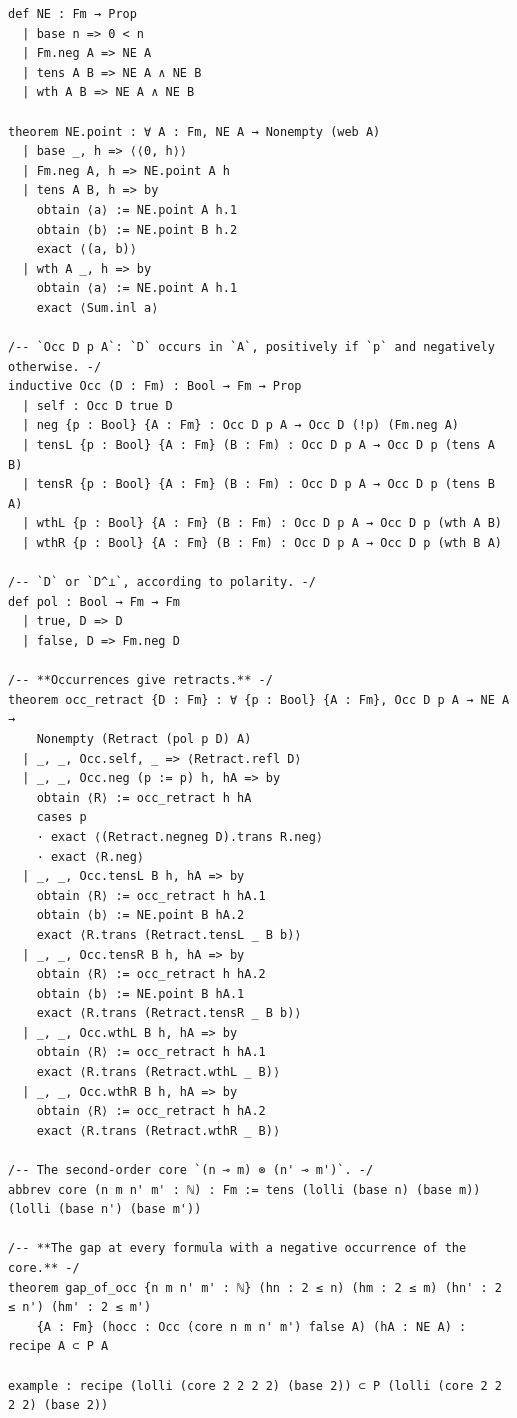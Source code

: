 \label{lean:gap-of-occ}
\begin{lstlisting}
def NE : Fm → Prop
  | base n => 0 < n
  | Fm.neg A => NE A
  | tens A B => NE A ∧ NE B
  | wth A B => NE A ∧ NE B

theorem NE.point : ∀ A : Fm, NE A → Nonempty (web A)
  | base _, h => ⟨⟨0, h⟩⟩
  | Fm.neg A, h => NE.point A h
  | tens A B, h => by
    obtain ⟨a⟩ := NE.point A h.1
    obtain ⟨b⟩ := NE.point B h.2
    exact ⟨(a, b)⟩
  | wth A _, h => by
    obtain ⟨a⟩ := NE.point A h.1
    exact ⟨Sum.inl a⟩

/-- `Occ D p A`: `D` occurs in `A`, positively if `p` and negatively otherwise. -/
inductive Occ (D : Fm) : Bool → Fm → Prop
  | self : Occ D true D
  | neg {p : Bool} {A : Fm} : Occ D p A → Occ D (!p) (Fm.neg A)
  | tensL {p : Bool} {A : Fm} (B : Fm) : Occ D p A → Occ D p (tens A B)
  | tensR {p : Bool} {A : Fm} (B : Fm) : Occ D p A → Occ D p (tens B A)
  | wthL {p : Bool} {A : Fm} (B : Fm) : Occ D p A → Occ D p (wth A B)
  | wthR {p : Bool} {A : Fm} (B : Fm) : Occ D p A → Occ D p (wth B A)

/-- `D` or `D^⊥`, according to polarity. -/
def pol : Bool → Fm → Fm
  | true, D => D
  | false, D => Fm.neg D

/-- **Occurrences give retracts.** -/
theorem occ_retract {D : Fm} : ∀ {p : Bool} {A : Fm}, Occ D p A → NE A →
    Nonempty (Retract (pol p D) A)
  | _, _, Occ.self, _ => ⟨Retract.refl D⟩
  | _, _, Occ.neg (p := p) h, hA => by
    obtain ⟨R⟩ := occ_retract h hA
    cases p
    · exact ⟨(Retract.negneg D).trans R.neg⟩
    · exact ⟨R.neg⟩
  | _, _, Occ.tensL B h, hA => by
    obtain ⟨R⟩ := occ_retract h hA.1
    obtain ⟨b⟩ := NE.point B hA.2
    exact ⟨R.trans (Retract.tensL _ B b)⟩
  | _, _, Occ.tensR B h, hA => by
    obtain ⟨R⟩ := occ_retract h hA.2
    obtain ⟨b⟩ := NE.point B hA.1
    exact ⟨R.trans (Retract.tensR _ B b)⟩
  | _, _, Occ.wthL B h, hA => by
    obtain ⟨R⟩ := occ_retract h hA.1
    exact ⟨R.trans (Retract.wthL _ B)⟩
  | _, _, Occ.wthR B h, hA => by
    obtain ⟨R⟩ := occ_retract h hA.2
    exact ⟨R.trans (Retract.wthR _ B)⟩

/-- The second-order core `(n ⊸ m) ⊗ (n' ⊸ m')`. -/
abbrev core (n m n' m' : ℕ) : Fm := tens (lolli (base n) (base m)) (lolli (base n') (base m'))

/-- **The gap at every formula with a negative occurrence of the core.** -/
theorem gap_of_occ {n m n' m' : ℕ} (hn : 2 ≤ n) (hm : 2 ≤ m) (hn' : 2 ≤ n') (hm' : 2 ≤ m')
    {A : Fm} (hocc : Occ (core n m n' m') false A) (hA : NE A) : recipe A ⊂ P A

example : recipe (lolli (core 2 2 2 2) (base 2)) ⊂ P (lolli (core 2 2 2 2) (base 2))
\end{lstlisting}

